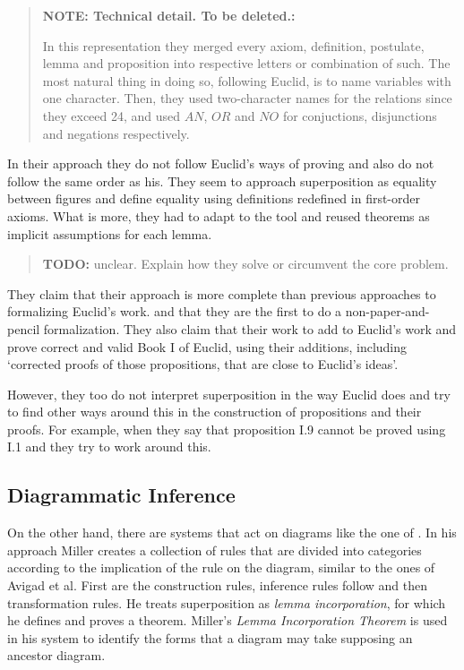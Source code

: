 \documentclass[]{interact}
\theoremstyle{plain}
\theoremstyle{definition}
\theoremstyle{remark}
\newcommand{\term}[1]{\emph{#1\/}}
\newcommand{\quotes}[1]{`#1'}
\newcommand{\comment}[2]
{
\begin{quote}
\textbf{#1:}
     #2
\end{quote}
}
\begin{document}
\comment{NOTE: Technical detail. To be deleted.}{
In this representation they merged every axiom, definition,
postulate, lemma and proposition into respective letters or
combination of such.  The most natural thing in doing so, following
Euclid, is to name variables with one character. Then, they used
two-character names for the relations since they exceed 24, and
used $AN$, $OR$ and $NO$ for conjuctions, disjunctions and
negations respectively. }

In their approach they do not follow Euclid's ways of proving and also
do not follow the same order as his. They seem to approach
superposition as equality between figures and define equality using 
\citet{hartshorne:2000} definitions redefined in first-order axioms.
What is more, they had to adapt to the tool and
reused theorems as implicit assumptions for each lemma.

\comment{TODO}{unclear. Explain how they solve or circumvent the 
core problem.}

They claim that their approach is more complete than previous
approaches to formalizing Euclid's work.  and that they are the first
to do a non-paper-and-pencil formalization.
They also claim that their work to add to Euclid's work and prove correct and 
valid Book I of Euclid, using their additions, including \quotes{corrected 
proofs of those propositions, that are close to Euclid's ideas}.


However, they too do not interpret superposition in the way Euclid
does and try to find other ways around this in the construction of
propositions and their proofs. For example, when they say that
proposition I.9 cannot be proved using I.1 and they try to work around
this.


\subsection{Diagrammatic Inference}
\label{sec:diagr-infer}

On the other hand, there are systems that act on diagrams like the one
of \citet{miller:2001}. In his approach Miller creates a
collection of rules that are divided into categories according to the
implication of the rule on the diagram, similar to the ones of Avigad
et al. First are the construction rules, inference rules follow and
then transformation rules. He treats superposition as
\term{lemma incorporation}, for which he defines and proves a theorem.
Miller's \term{Lemma Incorporation Theorem} is used in his system to
identify the forms that a diagram may take supposing an ancestor diagram.
\end{document}
